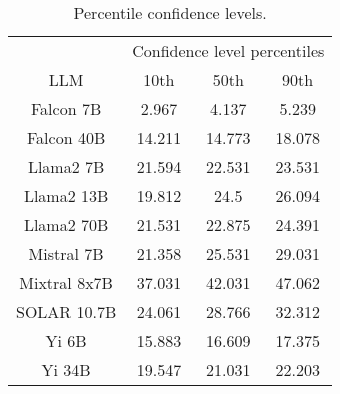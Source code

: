\begin{table*}
\centering
\begin{tabular}{c|c|c|c}
& \multicolumn{3}{c}{Confidence level percentiles} \\ 
LLM & 10th & 50th & 90th\\ \hline
Falcon 7B & 2.967 & 4.137 & 5.239\\
Falcon 40B & 14.211 & 14.773 & 18.078\\
Llama2 7B & 21.594 & 22.531 & 23.531\\
Llama2 13B & 19.812 & 24.5 & 26.094\\
Llama2 70B & 21.531 & 22.875 & 24.391\\
Mistral 7B & 21.358 & 25.531 & 29.031\\
Mixtral 8x7B & 37.031 & 42.031 & 47.062\\
SOLAR 10.7B & 24.061 & 28.766 & 32.312\\
Yi 6B & 15.883 & 16.609 & 17.375\\
Yi 34B & 19.547 & 21.031 & 22.203\\
\hline
\end{tabular}
\caption{Percentile confidence levels.}
\label{tab:percentile_conf}
\end{table*}
